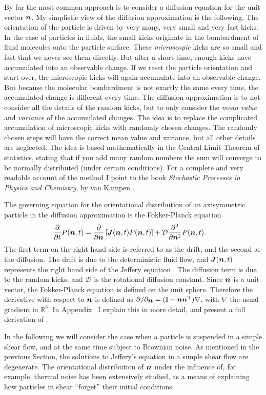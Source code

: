 \documentclass[thesis.tex]{subfiles}
\begin{document}
By far the most common approach is to consider a diffusion equation for the unit vector $\mbox{\boldmath$n$}$. My simplistic view of the diffusion approximation is the following. The orientation of the particle is driven by very many, very small and very fast kicks. In the case of particles in fluids, the small kicks originate in the bombardment of fluid molecules onto the particle surface. These \emph{microscopic} kicks are so small and fast that we never see them directly. But after a short time, enough kicks have accumulated into an observable change. If we reset the particle orientation and start over, the microscopic kicks will again accumulate into an observable change. But because the molecular bombardment is not exactly the same every time, the accumulated change is different every time. The diffusion approximation is to not consider all the details of the random kicks, but to only consider the \emph{mean value} and \emph{variance} of the accumulated changes. The idea is to replace the complicated accumulation of microscopic kicks with randomly chosen changes. The randomly chosen steps will have the correct mean value and variance, but all other details are neglected. The idea is based mathematically in the Central Limit Theorem of statistics, stating that if you add many random numbers the sum will converge to be normally distributed (under certain conditions). For a complete and very readable account of the method I point to the book \emph{Stochastic Processes in Physics and Chemistry}, by van Kampen \cite{kampen2007}.

The governing equation for the orientational distribution of an axisymmetric particle in the diffusion approximation is the Fokker-Planck equation
\begin{align}
	\frac{\partial}{\partial t}P(\ve n, t) &= \frac{\partial}{\partial \ve n}\left[\ve J (\ve n, t)P(\ve n, t)\right] + \mathcal D \frac{\partial^2}{\partial \ve n^2}P(\ve n, t).\eqnlab{fpejeff}
\end{align}
The first term on the right hand side is referred to as the drift, and the second as the diffusion. The drift is due to the deterministic fluid flow, and $\mbox{\boldmath$J$}(\mbox{\boldmath$n$}, t)$ represents the right hand side of the Jeffery equation . The diffusion term is due to the random kicks, and $\mathcal D$ is the rotational diffusion constant. Since $\mbox{\boldmath$n$}$ is a unit vector, the Fokker-Planck equation is defined on the unit sphere. Therefore the derivative with respect to $\mbox{\boldmath$n$}$ is defined as $\partial/\partial_{\mbox{\boldmath$n$}} = (\mathbb{I}-\mbox{\boldmath$n$}\mbox{\boldmath$n$}^{\mathrm T})\nabla$, with $\nabla$ the usual gradient in $\mathbb R^3$. In Appendix~ I explain this in more detail, and present a full derivation of . 

In the following we will consider the case when a particle is suspended in a simple shear flow, and at the same time subject to Brownian noise. As mentioned in the previous Section, the solutions to Jeffery's equation in a simple shear flow are degenerate. The orientational distribution of $\mbox{\boldmath$n$}$ under the influence of, for example, thermal noise has been extensively studied, as a means of explaining how particles in shear ``forget'' their initial conditions.
\end{document}
